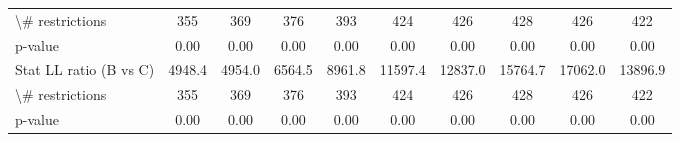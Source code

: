 \documentclass[11pt,twoside, authoryear]{elsarticle}
\begin{document}
\begin{landscape}
\begin{table}[htbp]
{\begin{tabular}{l|c|c|c|c|c|c|c|c|c}
    \textbackslash{}\# restrictions & \multicolumn{1}{c}{355} & \multicolumn{1}{c}{369} & \multicolumn{1}{c}{376} & \multicolumn{1}{c}{393} & \multicolumn{1}{c}{424} & \multicolumn{1}{c}{426} & \multicolumn{1}{c}{428} & \multicolumn{1}{c}{426} & \multicolumn{1}{c}{422} \\
    p-value & \multicolumn{1}{c}{0.00} & \multicolumn{1}{c}{0.00} & \multicolumn{1}{c}{0.00} & \multicolumn{1}{c}{0.00} & \multicolumn{1}{c}{0.00} & \multicolumn{1}{c}{0.00} & \multicolumn{1}{c}{0.00} & \multicolumn{1}{c}{0.00} & \multicolumn{1}{c}{0.00} \\ \hline
    Stat LL ratio (B vs C) & \multicolumn{1}{c}{4948.4} & \multicolumn{1}{c}{4954.0} & \multicolumn{1}{c}{6564.5} & \multicolumn{1}{c}{8961.8} & \multicolumn{1}{c}{11597.4} & \multicolumn{1}{c}{12837.0} & \multicolumn{1}{c}{15764.7} & \multicolumn{1}{c}{17062.0} & \multicolumn{1}{c}{13896.9} \\
    \textbackslash{}\# restrictions & \multicolumn{1}{c}{355} & \multicolumn{1}{c}{369} & \multicolumn{1}{c}{376} & \multicolumn{1}{c}{393} & \multicolumn{1}{c}{424} & \multicolumn{1}{c}{426} & \multicolumn{1}{c}{428} & \multicolumn{1}{c}{426} & \multicolumn{1}{c}{422} \\
    p-value & \multicolumn{1}{c}{0.00} & \multicolumn{1}{c}{0.00} & \multicolumn{1}{c}{0.00} & \multicolumn{1}{c}{0.00} & \multicolumn{1}{c}{0.00} & \multicolumn{1}{c}{0.00} & \multicolumn{1}{c}{0.00} & \multicolumn{1}{c}{0.00} & \multicolumn{1}{c}{0.00} \\ \hline \hline
\end{tabular}%
}
\end{table}%
\end{landscape}
\end{document}
